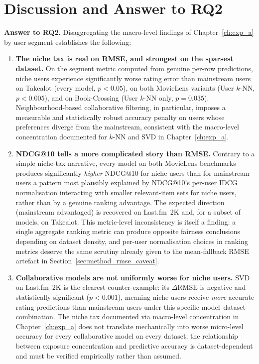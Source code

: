 \documentclass[11pt,a4paper]{report}
\begin{document}
\section{Discussion and Answer to RQ2}
\label{sec:expb_discussion}

\textbf{Answer to RQ2.} Disaggregating the macro-level findings of Chapter~\ref{ch:exp_a} by user segment establishes the following:

\begin{enumerate}
    \item \textbf{The niche tax is real on RMSE, and strongest on the sparsest dataset.} On the segment metric computed from genuine per-row predictions, niche users experience significantly worse rating error than mainstream users on Takealot (every model, $p < 0.05$), on both MovieLens variants (User $k$-NN, $p < 0.005$), and on Book-Crossing (User $k$-NN only, $p = 0.035$). Neighbourhood-based collaborative filtering, in particular, imposes a measurable and statistically robust accuracy penalty on users whose preferences diverge from the mainstream, consistent with the macro-level concentration documented for $k$-NN and SVD in Chapter~\ref{ch:exp_a}.

    \item \textbf{NDCG@10 tells a more complicated story than RMSE.} Contrary to a simple niche-tax narrative, every model on both MovieLens benchmarks produces significantly \emph{higher} NDCG@10 for niche users than for mainstream users a pattern most plausibly explained by NDCG@10's per-user IDCG normalisation interacting with smaller relevant-item sets for niche users, rather than by a genuine ranking advantage. The expected direction (mainstream advantaged) is recovered on Last.fm~2K and, for a subset of models, on Takealot. This metric-level inconsistency is itself a finding: a single aggregate ranking metric can produce opposite fairness conclusions depending on dataset density, and per-user normalisation choices in ranking metrics deserve the same scrutiny already given to the mean-fallback RMSE artefact in Section~\ref{sec:method_rmse_caveat}.

    \item \textbf{Collaborative models are not uniformly worse for niche users.} SVD on Last.fm~2K is the clearest counter-example: its $\Delta\mathrm{RMSE}$ is negative and statistically significant ($p < 0.001$), meaning niche users receive \emph{more} accurate rating predictions than mainstream users under this specific model--dataset combination. The niche tax documented via macro-level concentration in Chapter~\ref{ch:exp_a} does not translate mechanically into worse micro-level accuracy for every collaborative model on every dataset; the relationship between exposure concentration and predictive accuracy is dataset-dependent and must be verified empirically rather than assumed.


\end{enumerate}
\end{document}
